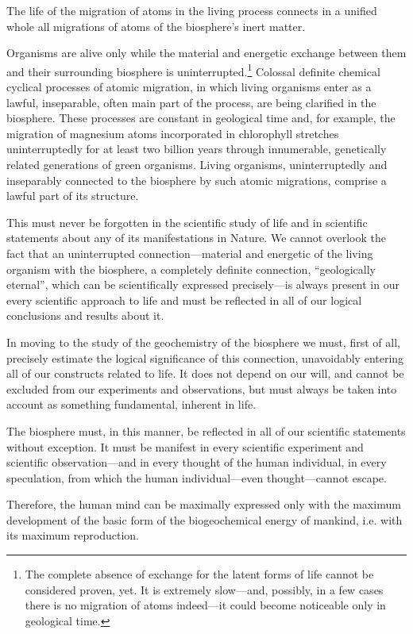 The life of the migration of atoms in the living process connects in a unified
whole all migrations of atoms of the biosphere's inert matter.

Organisms are alive only while the material and energetic exchange between
them and their surrounding biosphere is uninterrupted.\footnote{
	The complete absence of exchange for the latent forms of life cannot be
	considered proven, yet.  It is extremely slow---and, possibly, in a few
	cases there is no migration of atoms indeed---it could become
	noticeable only in geological time.
}  Colossal definite chemical cyclical processes of atomic migration, in which
living organisms enter as a lawful, inseparable, often main part of the
process, are being clarified in the biosphere.  These processes are constant in
geological time and, for example, the migration of magnesium atoms incorporated
in chlorophyll stretches uninterruptedly for at least two billion years through
innumerable, genetically related generations of green organisms.  Living
organisms, uninterruptedly and inseparably connected to the biosphere by such
atomic migrations, comprise a lawful part of its structure.

This must never be forgotten in the scientific study of life and in scientific
statements about any of its manifestations in Nature.  We cannot overlook the
fact that an uninterrupted connection---material and energetic of the living
organism with the biosphere, a completely definite connection, ``geologically
eternal'', which can be scientifically expressed precisely---is always present
in our every scientific approach to life and must be reflected in all of our
logical conclusions and results about it.

In moving to the study of the geochemistry of the biosphere we must, first of
all, precisely estimate the logical significance of this connection,
unavoidably entering all of our constructs related to life.  It does not
depend on our will, and cannot be excluded from our experiments and
observations, but must always be taken into account as something fundamental,
inherent in life.

The biosphere must, in this manner, be reflected in all of our scientific
statements without exception.  It must be manifest in every scientific
experiment and scientific observation---and in every thought of the human
individual, in every speculation, from which the human individual---even
thought---cannot escape.

Therefore, the human mind can be maximally expressed only with the maximum
development of the basic form of the biogeochemical energy of mankind, i.e.
with its maximum reproduction.


